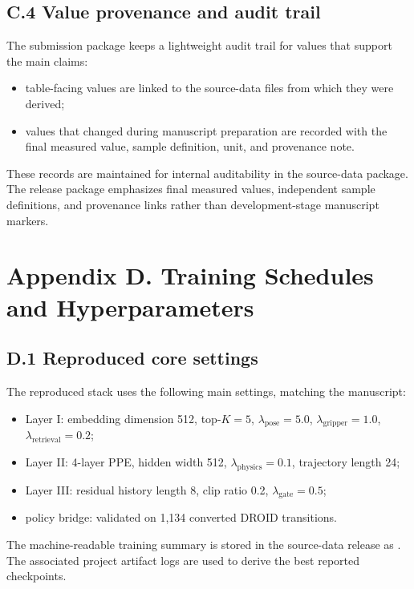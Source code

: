 \documentclass[11pt]{article}
\begin{document}
\subsection{C.4 Value provenance and audit trail}

The submission package keeps a lightweight audit trail for values that support the main claims:

\begin{itemize}[leftmargin=1.5em]
\item table-facing values are linked to the source-data files from which they were derived;
\item values that changed during manuscript preparation are recorded with the final measured value, sample definition, unit, and provenance note.
\end{itemize}

These records are maintained for internal auditability in the source-data package. The release package emphasizes final measured values, independent sample definitions, and provenance links rather than development-stage manuscript markers.

\section{Appendix D. Training Schedules and Hyperparameters}

\subsection{D.1 Reproduced core settings}

The reproduced stack uses the following main settings, matching the manuscript:

\begin{itemize}[leftmargin=1.5em]
\item Layer I: embedding dimension 512, top-$K=5$, $\lambda_{\mathrm{pose}}=5.0$, $\lambda_{\mathrm{gripper}}=1.0$, $\lambda_{\mathrm{retrieval}}=0.2$;
\item Layer II: 4-layer PPE, hidden width 512, $\lambda_{\mathrm{physics}}=0.1$, trajectory length 24;
\item Layer III: residual history length 8, clip ratio 0.2, $\lambda_{\mathrm{gate}}=0.5$;
\item policy bridge: validated on 1,134 converted DROID transitions.
\end{itemize}

The machine-readable training summary is stored in the source-data release as
.
The associated project artifact logs are used to derive the best reported checkpoints.
\end{document}
